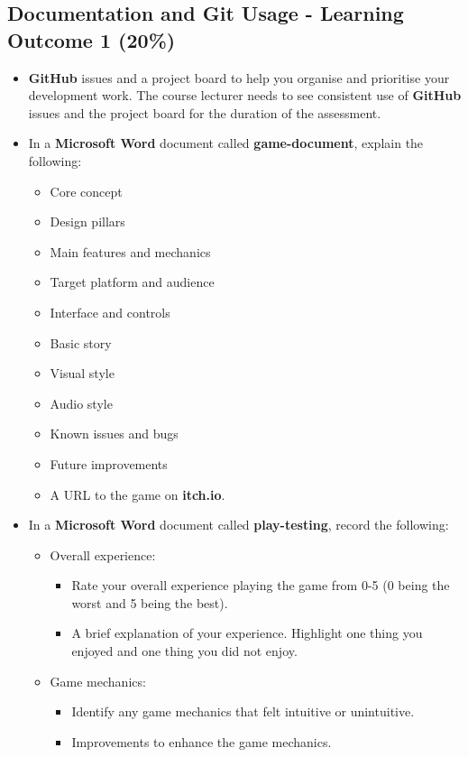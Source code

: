 \documentclass{article}
\begin{document}
\subsection*{Documentation and Git Usage - Learning Outcome 1 (20\%)}
\begin{itemize}
	\item \textbf{GitHub} issues and a project board to help you organise and prioritise your development work. The course lecturer needs to see consistent use of \textbf{GitHub} issues and the project board for the duration of the assessment.
	\item In a \textbf{Microsoft Word} document called \textbf{game-document}, explain the following:
	\begin{itemize}
		\item Core concept
		\item Design pillars
		\item Main features and mechanics
		\item Target platform and audience
		\item Interface and controls
		\item Basic story
		\item Visual style
		\item Audio style
		\item Known issues and bugs
		\item Future improvements
		\item A URL to the game on \textbf{itch.io}.
	\end{itemize}
	\item In a \textbf{Microsoft Word} document called \textbf{play-testing}, record the following:
	\begin{itemize}
		\item Overall experience:
		\begin{itemize}
			\item Rate your overall experience playing the game from 0-5 (0 being the worst and 5 being the best).
			\item A brief explanation of your experience. Highlight one thing you enjoyed and one thing you did not enjoy.
		\end{itemize}
		\item Game mechanics:
		\begin{itemize}
			\item Identify any game mechanics that felt intuitive or unintuitive.
			\item Improvements to enhance the game mechanics.
		\end{itemize}

\end{itemize}
\end{itemize}
\end{document}

